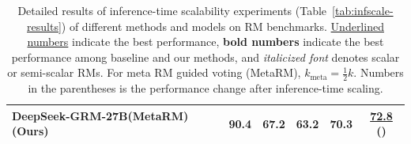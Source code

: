 \documentclass{article} %
\newcommand{\SGRM}{DeepSeek-GRM-27B\xspace}
\begin{document}
\begin{table}[t]
{\begin{tabular}{lccccc}
  \textbf{\SGRM (MetaRM) (Ours)} & \textbf{90.4} & 67.2 & \textbf{63.2} & \textbf{70.3} & \uline{\textbf{72.8}} ({\color{mydarkgreen}{+4.9}}) \\
  \bottomrule
  \end{tabular}
  }
  \caption{Detailed results of inference-time scalability experiments (Table~\ref{tab:infscale-results}) of different methods and models on RM benchmarks. \uline{Underlined numbers} indicate the best performance, \textbf{bold numbers} indicate the best performance among baseline and our methods, and \textit{italicized font} denotes scalar or semi-scalar RMs. For meta RM guided voting (MetaRM), $k_{\mathrm{meta}} = \frac{1}{2}k$. Numbers in the parentheses is the performance change after inference-time scaling.}
  \label{tab:infscale-results-detail}
  \vspace{-1em}
\end{table}
\end{document}
